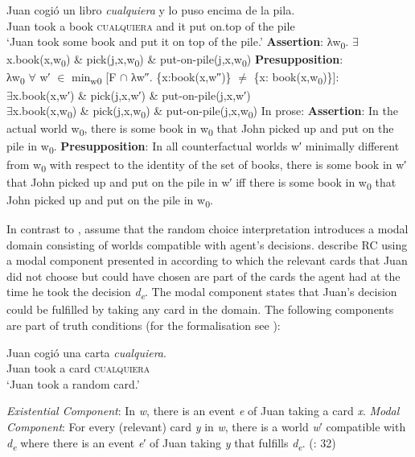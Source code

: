 \ea \label{bkm:Ref517736} %
\ea \gll Juan cogió un libro \textit{cualquiera} y lo puso encima de la pila. \\
Juan took a book \textsc{cualquiera} and it put on.top of the pile\\
\glt ‘Juan took some book and put it on top of the pile.’
\ea \textbf{Assertion}: λw\textsubscript{0}. ${\exists}$x.book(x,w\textsubscript{0}) \& pick(j,x,w\textsubscript{0}) \& put-on-pile(j,x,w\textsubscript{0})
\ex \textbf{Presupposition}: \\
λw\textsubscript{0} ${\forall}$ w′ ${\in}$ min\textsubscript{w0} [F ${\cap}$ λw″. \{x:book(x,w″)\} ${\neq}$ \{x: book(x,w\textsubscript{0})\}]:\\
${\exists}$x.book(x,w′) \& pick(j,x,w′) \& put-on-pile(j,x,w′)\\
${\exists}$x.book(x,w\textsubscript{0}) \& pick(j,x,w\textsubscript{0}) \& put-on-pile(j,x,w\textsubscript{0})
\z
\ex In prose:
\ea  \textbf{Assertion}: In the actual world w\textsubscript{0}, there is some book in w\textsubscript{0} that John picked up and put on the pile in w\textsubscript{0}.
\ex \textbf{Presupposition}: In all counterfactual worlds w′ minimally different from w\textsubscript{0} with respect to the identity of the set of books, there is some book in w′ that John picked up and put on the pile in w′ iff there is some book in w\textsubscript{0} that John picked up and put on the pile in w\textsubscript{0}.
\z
\z
\z

In contrast to \citet{ChoiRomero2008}, \citet{am2018} assume that the random choice interpretation introduces a modal domain consisting of worlds compatible with agent’s decisions. \citet{am2018} describe RC using a modal component presented in  according to which the relevant cards that Juan did not choose but could have chosen are part of the cards the agent had at the time he took the decision \textit{d\textsubscript{e}}. The modal component states that Juan’s decision could be fulfilled by taking any card in the domain. The following components are part of truth conditions (for the formalisation see \citealt{am2018}):

\ea %
    \gll Juan cogió una carta \textit{cualquiera}.\\
    Juan took a card \textsc{cualquiera}\\
    \glt ‘Juan took a random card.’
\z


\ea \label{bkm:Ref150779122} %
\ea \textit{Existential Component}: In \textit{w}, there is an event \textit{e} of Juan taking a card \textit{x}.
\ex \label{bkm:Ref150779122-2} \textit{Modal Component}: For every (relevant) card \textit{y} in \textit{w}, there is a world \textit{w}′ compatible with \textit{d\textsubscript{e}} where there is an event \textit{e}′ of Juan taking \textit{y} that fulfills \textit{d\textsubscript{e}}.
    (\citealt{am2018}: 32)
\z
\z

